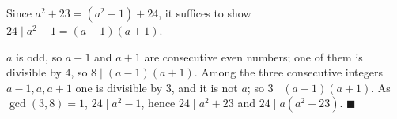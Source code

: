Since $a^2+23=(a^2-1)+24$, it suffices to show $24\mid a^2-1=(a-1)(a+1)$.

$a$ is odd, so $a-1$ and $a+1$ are consecutive even numbers; one of them is divisible by $4$, so $8\mid(a-1)(a+1)$. Among the three consecutive integers $a-1,a,a+1$ one is divisible by $3$, and it is not $a$; so $3\mid(a-1)(a+1)$. As $\gcd(3,8)=1$, $24\mid a^2-1$, hence $24\mid a^2+23$ and $24\mid a(a^2+23)$. $\blacksquare$
